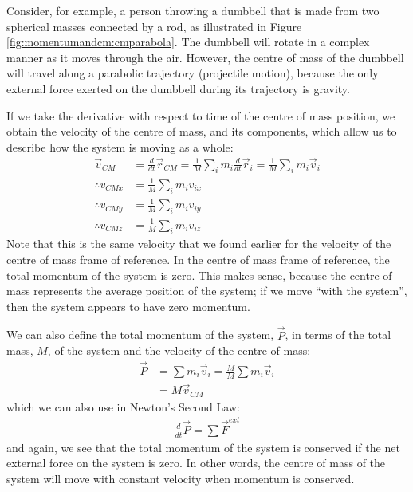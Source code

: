 Consider, for example, a person throwing a dumbbell that is made from two spherical masses connected by a rod, as illustrated in Figure \ref{fig:momentumandcm:cmparabola}. The dumbbell will rotate in a complex manner as it moves through the air. However, the centre of mass of the dumbbell will travel along a parabolic trajectory (projectile motion), because the only external force exerted on the dumbbell during its trajectory is gravity.


If we take the derivative with respect to time of the centre of mass position, we obtain the velocity of the centre of mass, and its components, which allow us to describe how the system is moving as a whole:
\begin{align}
\vec v_{CM} &= \frac{d}{dt}\vec r_{CM} = \frac{1}{M}\sum_i m_i\frac{d}{dt}\vec r_i=  \frac{1}{M}\sum_i m_i\vec v_i\nonumber\\
\therefore v_{CMx} &= \frac{1}{M}\sum_i m_i v_{ix}\nonumber\\
\therefore v_{CMy} &= \frac{1}{M}\sum_i m_i v_{iy}\nonumber\\
\therefore v_{CMz} &= \frac{1}{M}\sum_i m_i v_{iz}
\end{align}
Note that this is the same velocity that we found earlier for the velocity of the centre of mass frame of reference. In the centre of mass frame of reference, the total momentum of the system is zero. This makes sense, because the centre of mass represents the average position of the system; if we move ``with the system'', then the system appears to have zero momentum.

We can also define the total momentum of the system, $\vec P$, in terms of the total mass, $M$, of the system and the velocity of the centre of mass:
\begin{align*}
\vec P &= \sum m_i \vec v_i = \frac{M}{M}\sum m_i \vec v_i\\
&=M\vec v_{CM}
\end{align*}
which we can also use in Newton's Second Law:
\begin{align*}
\frac{d}{dt}\vec P = \sum \vec F^{ext}
\end{align*}
and again, we see that the total momentum of the system is conserved if the net external force on the system is zero. In other words, the centre of mass of the system will move with constant velocity when momentum is conserved.

